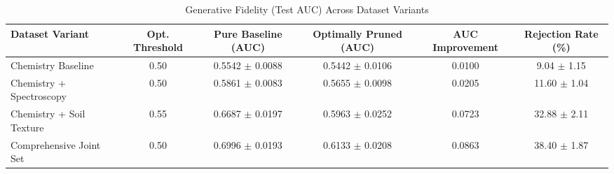 \begin{table}[!ht]
\centering
\caption{Generative Fidelity (Test AUC) Across Dataset Variants}
\label{tab:auc_results}
\begin{tabular}{lccccc}
\toprule
Dataset Variant & Opt. Threshold & Pure Baseline (AUC) & Optimally Pruned (AUC) & AUC Improvement & Rejection Rate (\%) \\
\midrule
Chemistry Baseline & 0.50 & 0.5542 $\pm$ 0.0088 & 0.5442 $\pm$ 0.0106 & 0.0100 & 9.04 $\pm$ 1.15 \\
Chemistry + Spectroscopy & 0.50 & 0.5861 $\pm$ 0.0083 & 0.5655 $\pm$ 0.0098 & 0.0205 & 11.60 $\pm$ 1.04 \\
Chemistry + Soil Texture & 0.55 & 0.6687 $\pm$ 0.0197 & 0.5963 $\pm$ 0.0252 & 0.0723 & 32.88 $\pm$ 2.11 \\
Comprehensive Joint Set & 0.50 & 0.6996 $\pm$ 0.0193 & 0.6133 $\pm$ 0.0208 & 0.0863 & 38.40 $\pm$ 1.87 \\
\bottomrule
\end{tabular}
\end{table}

